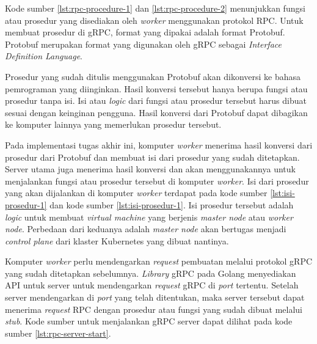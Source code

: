 Kode sumber \ref{lst:rpc-procedure-1} dan \ref{lst:rpc-procedure-2} menunjukkan fungsi atau prosedur
yang disediakan oleh \emph{worker} menggunakan protokol RPC. Untuk membuat prosedur
di gRPC, format yang dipakai adalah format Protobuf. Protobuf merupakan format
yang digunakan oleh gRPC sebagai \emph{Interface Definition Language}.

Prosedur yang sudah ditulis menggunakan Protobuf akan dikonversi
ke bahasa pemrograman yang diinginkan. Hasil konversi tersebut hanya
berupa fungsi atau prosedur tanpa isi. Isi atau \emph{logic} dari fungsi atau prosedur
tersebut harus dibuat sesuai dengan keinginan pengguna. Hasil konversi dari Protobuf
dapat dibagikan ke komputer lainnya yang memerlukan prosedur tersebut. 

Pada implementasi tugas akhir ini, komputer \emph{worker} menerima
hasil konversi dari prosedur dari Protobuf dan membuat isi dari
prosedur yang sudah ditetapkan. Server utama juga menerima hasil konversi
dan akan menggunakannya untuk menjalankan fungsi atau prosedur tersebut di komputer
\emph{worker}. Isi dari prosedur yang akan dijalankan di komputer \emph{worker} terdapat
pada kode sumber \ref{lst:isi-prosedur-1} dan kode sumber \ref{lst:isi-prosedur-1}. Isi prosedur tersebut adalah \emph{logic}
untuk membuat \emph{virtual machine} yang berjenis \emph{master node} atau \emph{worker node}.
Perbedaan dari keduanya adalah \emph{master node} akan bertugas menjadi \emph{control plane}
dari klaster Kubernetes yang dibuat nantinya.





Komputer \emph{worker} perlu mendengarkan \emph{request} pembuatan melalui
protokol gRPC yang sudah ditetapkan sebelumnya. \emph{Library} gRPC pada Golang
menyediakan API untuk server untuk mendengarkan \emph{request} gRPC di \emph{port}
tertentu. Setelah server mendengarkan di \emph{port} yang telah ditentukan, maka
server tersebut dapat menerima \emph{request} RPC dengan prosedur atau fungsi
yang sudah dibuat melalui \emph{stub}. Kode sumber untuk menjalankan
gRPC server dapat dilihat pada kode sumber \ref{lst:rpc-server-start}.

